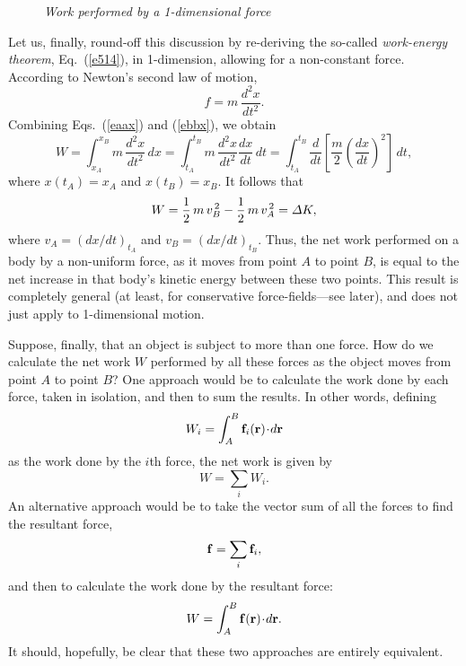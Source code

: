 \begin{figure}
\epsfysize=2in
\centerline{}
\caption{\em Work performed by a 1-dimensional force}\label{f39}   
\end{figure}

Let us, finally, round-off this discussion by re-deriving the so-called {\em work-energy theorem},
Eq.~(\ref{e514}), in 1-dimension, allowing for a non-constant force. 
According to Newton's second law of motion,
\begin{equation}\label{ebbx}
f = m\,\frac{d^2x}{dt^2}.
\end{equation}
Combining Eqs.~(\ref{eaax}) and (\ref{ebbx}), we obtain
\begin{equation}
W = \int_{x_A}^{x_B} m\,\frac{d^2 x}{dt^2}\,dx = \int_{t_A}^{t_B} m\,\frac{d^2 x}{dt^2}\frac{dx}{dt}\,dt
= \int_{t_A}^{t_B} \frac{d}{dt}\!\left[\frac{m}{2}\!\left(\frac{dx}{dt}\right)^2\right]\,dt,
\end{equation}
where $x(t_A)=x_A$ and $x(t_B)=x_B$.
It follows that 
\begin{equation}
W = \frac{1}{2}\,m\,v_B^{\,2} -\frac{1}{2}\,m\,v_A^{\,2} = {\mit\Delta}K,
\end{equation}
where $v_A = (dx/dt)_{t_A}$ and $v_B = (dx/dt)_{t_B}$. Thus, the net work performed on a
body by a non-uniform force,  as it moves from point $A$ to point $B$, is equal
to the net  increase in that body's kinetic energy  between these two points. This result
is completely general (at least, for conservative force-fields---see later), and does not just apply to 1-dimensional motion.

Suppose, finally, that an object is subject to more than one force. How do we calculate the
net work $W$ performed by all these forces as the object moves from point $A$ to
point $B$? One approach would be to calculate the work done by each force, taken
in isolation, and then to sum the results. In other words, defining
\begin{equation}
W_i = \int_A^B {\bf f}_i({\bf r})\!\cdot\!d{\bf r}
\end{equation}
as the work done by the $i$th force, the net work is given by
\begin{equation}
W = \sum_i W_i.
\end{equation}
An alternative approach would be to take the vector sum of all the forces to find the
resultant force,
\begin{equation}
{\bf f} = \sum_i {\bf f}_i,
\end{equation}
and then to calculate the work done by the resultant force:
\begin{equation}
W = \int_A^B {\bf f}({\bf r})\!\cdot\!d{\bf r}.
\end{equation}
It should, hopefully, be clear that these two approaches are entirely equivalent.

